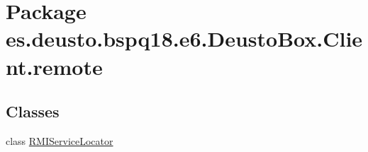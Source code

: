 \hypertarget{namespacees_1_1deusto_1_1bspq18_1_1e6_1_1_deusto_box_1_1_client_1_1remote}{}\section{Package es.\+deusto.\+bspq18.\+e6.\+Deusto\+Box.\+Client.\+remote}
\label{namespacees_1_1deusto_1_1bspq18_1_1e6_1_1_deusto_box_1_1_client_1_1remote}
\subsection*{Classes}
\begin{DoxyCompactItemize}
\item 
class \mbox{\hyperlink{classes_1_1deusto_1_1bspq18_1_1e6_1_1_deusto_box_1_1_client_1_1remote_1_1_r_m_i_service_locator}{R\+M\+I\+Service\+Locator}}
\end{DoxyCompactItemize}
